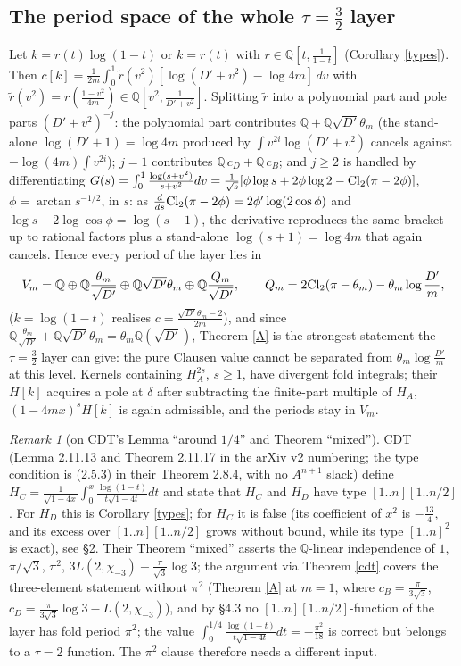 \documentclass[11pt]{amsart}
\theoremstyle{remark}
\newtheorem{remark}[theorem]{Remark}
\newcommand{\Q}{\mathbb Q}\newcommand{\Z}{\mathbb Z}\newcommand{\R}{\mathbb R}\newcommand{\C}{\mathbb C}
\newcommand{\lcm}[1]{[1..#1]}
\begin{document}
\subsection{The period space of the whole $\tau=\frac32$ layer}
Let $k=r(t)\log(1-t)$ or $k=r(t)$ with $r\in\Q[t,\frac1{1-t}]$ (Corollary \ref{types}). Then $c[k]=\frac1{2m}\int_0^1\tilde r(v^2)[\log(D'+v^2)-\log4m]\,dv$ with $\tilde r(v^2)=r(\frac{1-v^2}{4m})\in\Q[v^2,\frac1{D'+v^2}]$. Splitting $\tilde r$ into a polynomial part and pole parts $(D'+v^2)^{-j}$: the polynomial part contributes $\Q+\Q\sqrt{D'}\theta_m$ (the stand-alone $\log(D'+1)=\log4m$ produced by $\int v^{2i}\log(D'+v^2)$ cancels against $-\log(4m)\int v^{2i}$); $j=1$ contributes $\Q\,c_D+\Q\,c_B$; and $j\ge2$ is handled by differentiating $G(s)=\int_0^1\frac{\log(s+v^2)}{s+v^2}dv=\frac1{\sqrt s}[\phi\log s+2\phi\log2-\mathrm{Cl}_2(\pi-2\phi)]$, $\phi=\arctan s^{-1/2}$, in $s$: as $\frac{d}{ds}\mathrm{Cl}_2(\pi-2\phi)=2\phi'\log(2\cos\phi)$ and $\log s-2\log\cos\phi=\log(s+1)$, the derivative reproduces the same bracket up to rational factors plus a stand-alone $\log(s+1)=\log4m$ that again cancels. Hence every period of the layer lies in
\[
V_m=\Q\oplus\Q\frac{\theta_m}{\sqrt{D'}}\oplus\Q\sqrt{D'}\theta_m\oplus\Q\frac{Q_m}{\sqrt{D'}},\qquad Q_m=2\Cl(\pi-\theta_m)-\theta_m\log\frac{D'}m ,
\]
($k=\log(1-t)$ realises $c=\frac{\sqrt{D'}\theta_m-2}{2m}$), and since $\Q\frac{\theta_m}{\sqrt{D'}}+\Q\sqrt{D'}\theta_m=\theta_m\Q(\sqrt{D'})$, Theorem \ref{A} is the strongest statement the $\tau=\frac32$ layer can give: the pure Clausen value cannot be separated from $\theta_m\log\frac{D'}m$ at this level. Kernels containing $H_A^{2s}$, $s\ge1$, have divergent fold integrals; their $H[k]$ acquires a pole at $\delta$ after subtracting the finite-part multiple of $H_A$, $(1-4mx)^sH[k]$ is again admissible, and the periods stay in $V_m$.

\begin{remark}[on CDT's Lemma ``around $1/4$'' and Theorem ``mixed'']\label{erratum}
CDT (Lemma 2.11.13 and Theorem 2.11.17 in the arXiv v2 numbering; the type condition is (2.5.3) in their Theorem 2.8.4, with no $A^{n+1}$ slack) define $H_C=\frac1{\sqrt{1-4x}}\int_0^x\frac{\log(1-t)}{t\sqrt{1-4t}}dt$ and state that $H_C$ and $H_D$ have type $\lcm n\lcm{n/2}$. For $H_D$ this is Corollary \ref{types}; for $H_C$ it is false (its coefficient of $x^2$ is $-\frac{13}4$, and its excess over $\lcm n\lcm{n/2}$ grows without bound, while its type $\lcm n^2$ is exact), see \S2. Their Theorem ``mixed'' asserts the $\Q$-linear independence of $1$, $\pi/\sqrt3$, $\pi^2$, $3L(2,\chi_{-3})-\frac\pi{\sqrt3}\log3$; the argument via Theorem \ref{cdt} covers the three-element statement without $\pi^2$ (Theorem \ref{A} at $m=1$, where $c_B=\frac\pi{3\sqrt3}$, $c_D=\frac\pi{3\sqrt3}\log3-L(2,\chi_{-3})$), and by \S4.3 no $\lcm n\lcm{n/2}$-function of the layer has fold period $\pi^2$; the value $\int_0^{1/4}\frac{\log(1-t)}{t\sqrt{1-4t}}dt=-\frac{\pi^2}{18}$ is correct but belongs to a $\tau=2$ function. The $\pi^2$ clause therefore needs a different input.
\end{remark}
\end{document}

